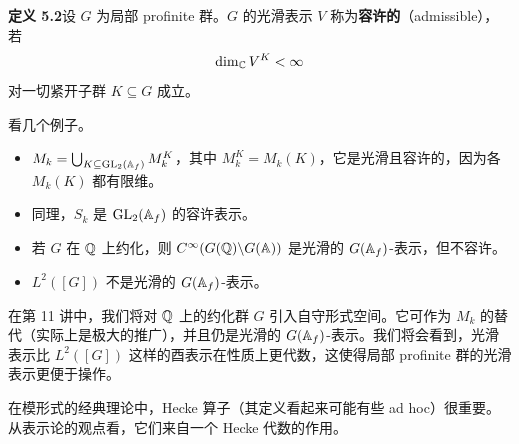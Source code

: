 \noindent\textbf{定义 5.2}\label{def:5.2}\quad 设 $G$ 为局部 profinite 群。$G$ 的光滑表示 $V$ 称为\textbf{容许的}（admissible），若
\[
\dim_{\mathbb{C}} V^K<\infty
\]
对一切紧开子群 $K\subseteq G$ 成立。

看几个例子。
\begin{itemize}
\item $M_k=\bigcup_{K\subseteq\operatorname{GL}_2(\mathbb{A}_f)}M_k^K$，其中 $M_k^K=M_k(K)$，它是光滑且容许的，因为各 $M_k(K)$ 都有限维。
\item 同理，$S_k$ 是 $\operatorname{GL}_2(\mathbb{A}_f)$ 的容许表示。
\item 若 $G$ 在 $\mathbb{Q}$ 上约化，则 $C^\infty(G(\mathbb{Q})\backslash G(\mathbb{A}))$ 是光滑的 $G(\mathbb{A}_f)$-表示，但不容许。
\item $L^2([G])$ 不是光滑的 $G(\mathbb{A}_f)$-表示。
\end{itemize}

在第 11 讲中，我们将对 $\mathbb{Q}$ 上的约化群 $G$ 引入自守形式空间。它可作为 $M_k$ 的替代（实际上是极大的推广），并且仍是光滑的 $G(\mathbb{A}_f)$-表示。我们将会看到，光滑表示比 $L^2([G])$ 这样的酉表示在性质上更代数，这使得局部 profinite 群的光滑表示更便于操作。

在模形式的经典理论中，Hecke 算子（其定义看起来可能有些 ad hoc）很重要。从表示论的观点看，它们来自一个 Hecke 代数的作用。

